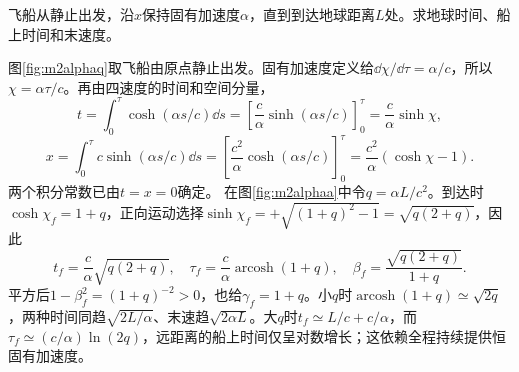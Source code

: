 \begin{exercise}\label{ex:m2constalpha}
飞船从静止出发，沿$x$保持固有加速度$\alpha$，直到到达地球距离$L$处。求地球时间、船上时间和末速度。
\end{exercise}
\begin{solution}
图\ref{fig:m2alphaq}取飞船由原点静止出发。固有加速度定义给$\dd\chi/\dd\tau=\alpha/c$，所以$\chi=\alpha\tau/c$。再由四速度的时间和空间分量，
\[
 t=\int_0^\tau\cosh(\alpha s/c)\dd s
 =\left[\frac c\alpha\sinh(\alpha s/c)\right]_0^\tau
 =\frac c\alpha\sinh\chi,
\]
\[
 x=\int_0^\tau c\sinh(\alpha s/c)\dd s
 =\left[\frac{c^2}\alpha\cosh(\alpha s/c)\right]_0^\tau
 =\frac{c^2}\alpha(\cosh\chi-1).
\]
两个积分常数已由$t=x=0$确定。
在图\ref{fig:m2alphaa}中令$q=\alpha L/c^2$。到达时$\cosh\chi_f=1+q$，正向运动选择$\sinh\chi_f=+\sqrt{(1+q)^2-1}=\sqrt{q(2+q)}$，因此
\[
 t_f=\frac c\alpha\sqrt{q(2+q)},\quad
 \tau_f=\frac c\alpha\operatorname{arcosh}(1+q),\quad
 \beta_f=\frac{\sqrt{q(2+q)}}{1+q}.
\]
平方后$1-\beta_f^2=(1+q)^{-2}>0$，也给$\gamma_f=1+q$。小$q$时$\operatorname{arcosh}(1+q)\simeq\sqrt{2q}$，两种时间同趋$\sqrt{2L/\alpha}$、末速趋$\sqrt{2\alpha L}$。大$q$时$t_f\simeq L/c+c/\alpha$，而$\tau_f\simeq(c/\alpha)\ln(2q)$，远距离的船上时间仅呈对数增长；这依赖全程持续提供恒固有加速度。
\end{solution}

